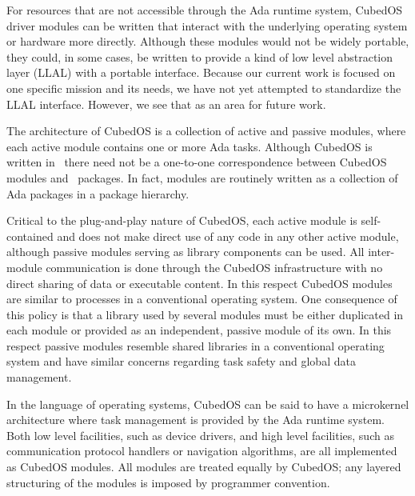 For resources that are not accessible through the Ada runtime system, CubedOS driver modules can
be written that interact with the underlying operating system or hardware more directly.
Although these modules would not be widely portable, they could, in some cases, be written to
provide a kind of low level abstraction layer (LLAL) with a portable interface. Because our
current work is focused on one specific mission and its needs, we have not yet attempted to
standardize the LLAL interface. However, we see that as an area for future work.

The architecture of CubedOS is a collection of active and passive modules, where each active
module contains one or more Ada tasks. Although CubedOS is written in \SPARK\ there need not be
a one-to-one correspondence between CubedOS modules and \SPARK\ packages. In fact, modules are
routinely written as a collection of Ada packages in a package hierarchy. 

Critical to the plug-and-play nature of CubedOS, each active module is self-contained and does
not make direct use of any code in any other active module, although passive modules serving as
library components can be used. All inter-module communication is done through the CubedOS
infrastructure with no direct sharing of data or executable content. In this respect CubedOS
modules are similar to processes in a conventional operating system. One consequence of this
policy is that a library used by several modules must be either duplicated in each module or
provided as an independent, passive module of its own. In this respect passive modules resemble
shared libraries in a conventional operating system and have similar concerns regarding task
safety and global data management.

In the language of operating systems, CubedOS can be said to have a microkernel architecture
where task management is provided by the Ada runtime system. Both low level facilities, such as
device drivers, and high level facilities, such as communication protocol handlers or navigation
algorithms, are all implemented as CubedOS modules. All modules are treated equally by CubedOS;
any layered structuring of the modules is imposed by programmer convention.


